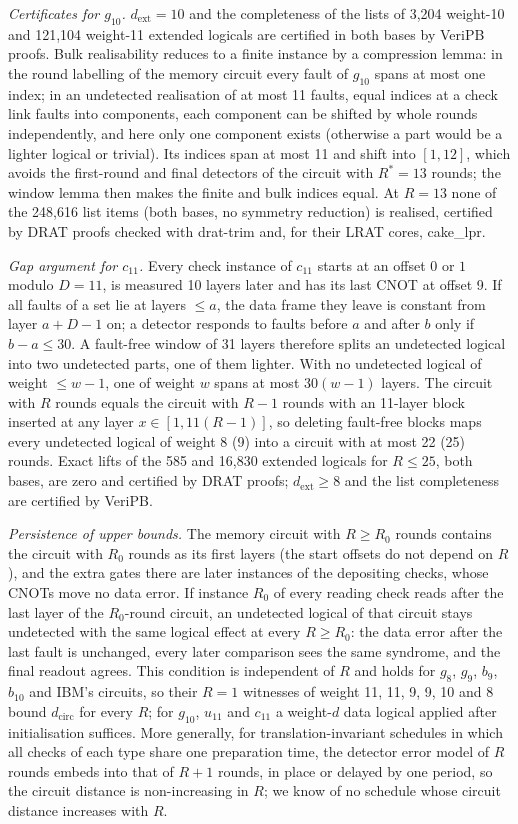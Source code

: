 \documentclass[aps,prl,twocolumn,superscriptaddress,nofootinbib]{revtex4-2}
\newcommand{\dcirc}{d_{\mathrm{circ}}}
\newcommand{\dext}{d_{\mathrm{ext}}}
\begin{document}
\emph{Certificates for $g_{10}$.} $\dext=10$ and the completeness of the lists of 3,204
weight-10 and 121,104 weight-11 extended logicals are certified in both bases by VeriPB
proofs. Bulk realisability reduces to a finite instance by a compression lemma: in the
round labelling of the memory circuit every fault of $g_{10}$ spans at most one index; in
an undetected realisation of at most 11 faults, equal indices at a check link faults into
components, each component can be shifted by whole rounds independently, and here only one
component exists (otherwise a part would be a lighter logical or trivial). Its indices
span at most 11 and shift into $[1,12]$, which avoids the first-round and final detectors
of the circuit with $R^*=13$ rounds; the window lemma then makes the finite and bulk
indices equal. At $R=13$ none of the 248,616 list items (both bases, no symmetry
reduction) is realised, certified by DRAT proofs checked with drat-trim and, for their LRAT
cores, cake\_lpr.

\emph{Gap argument for $c_{11}$.} Every check instance of $c_{11}$ starts at an offset
$0$ or $1$ modulo $D=11$, is measured 10 layers later and has its last CNOT at offset 9.
If all faults of a set lie at layers $\le a$, the data frame they leave is constant from
layer $a+D-1$ on; a detector responds to faults before $a$ and after $b$ only if $b-a\le30$.
A fault-free window of 31 layers therefore splits an undetected logical into two undetected
parts, one of them lighter. With no undetected logical of weight $\le w-1$, one of weight
$w$ spans at most $30(w-1)$ layers. The circuit with $R$ rounds equals the circuit with
$R-1$ rounds with an 11-layer block inserted at any layer $x\in[1,11(R-1)]$, so deleting
fault-free blocks maps every undetected logical of weight 8 (9) into a circuit with at
most 22 (25) rounds. Exact lifts of the 585 and 16,830 extended logicals for $R\le25$, both
bases, are zero and certified by DRAT proofs; $\dext\ge8$ and the list completeness are
certified by VeriPB.

\emph{Persistence of upper bounds.} The memory circuit with $R\ge R_0$ rounds contains the
circuit with $R_0$ rounds as its first layers (the start offsets do not depend on $R$),
and the extra gates there are later instances of the depositing checks, whose CNOTs move no
data error. If instance $R_0$ of every reading check reads after the last layer of the
$R_0$-round circuit, an undetected logical of that circuit stays undetected with the same
logical effect at every $R\ge R_0$: the data error after the last fault is unchanged, every
later comparison sees the same syndrome, and the final readout agrees. This condition is
independent of $R$ and holds for $g_8$, $g_9$, $b_9$, $b_{10}$ and IBM's circuits, so their
$R=1$ witnesses of weight 11, 11, 9, 9, 10 and 8 bound $\dcirc$ for every $R$; for $g_{10}$,
$u_{11}$ and $c_{11}$ a weight-$d$ data logical applied after initialisation
suffices. More generally, for translation-invariant schedules in which all
checks of each type share one preparation time, the detector error model of $R$ rounds
embeds into that of $R+1$ rounds, in place or delayed by one period, so the circuit distance
is non-increasing in $R$; we know of no schedule whose circuit distance increases with $R$.
\end{document}
